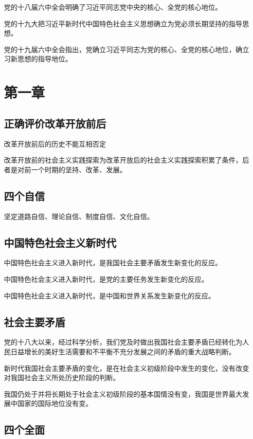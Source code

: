 \documentclass[11pt, a4paper]{article}
\begin{document}
党的十八届六中全会明确了习近平同志党中央的核心、全党的核心地位。

党的十九大把习近平新时代中国特色社会主义思想确立为党必须长期坚持的指导思想。

党的十九届六中全会指出，党确立习近平同志为党的核心、全党的核心地位，确立习新思想的指导地位。

\section*{第一章}

\subsection*{正确评价改革开放前后}

改革开放前后的历史不能互相否定

改革开放前的社会主义实践探索为改革开放后的社会主义实践探索积累了条件，后者是对前一个时期的坚持、改革、发展。

\subsection*{四个自信}

坚定道路自信、理论自信、制度自信、文化自信。

\subsection*{中国特色社会主义新时代}

中国特色社会主义进入新时代，是我国社会主要矛盾发生新变化的反应。

中国特色社会主义进入新时代，是党的主要任务发生新变化的反应。

中国特色社会主义进入新时代，是中国和世界关系发生新变化的反应。

\subsection*{社会主要矛盾}

党的十八大以来，经过科学分析，我们党及时做出我国社会主要矛盾已经转化为人民日益增长的美好生活需要和不平衡不充分发展之间的矛盾的重大战略判断。

新时代我国社会主要矛盾的变化，是在社会主义初级阶段中发生的变化，没有改变对我国社会主义所处历史阶段的判断。

我国仍处于并将长期处于社会主义初级阶段的基本国情没有变，我国是世界最大发展中国家的国际地位没有变。

\subsection*{四个全面}
\end{document}
